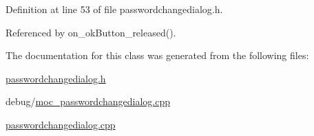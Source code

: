 Definition at line 53 of file passwordchangedialog.h.

Referenced by on\_\-okButton\_\-released().

The documentation for this class was generated from the following files:\begin{CompactItemize}
\item 
\hyperlink{passwordchangedialog_8h}{passwordchangedialog.h}\item 
debug/\hyperlink{moc__passwordchangedialog_8cpp}{moc\_\-passwordchangedialog.cpp}\item 
\hyperlink{passwordchangedialog_8cpp}{passwordchangedialog.cpp}\end{CompactItemize}
